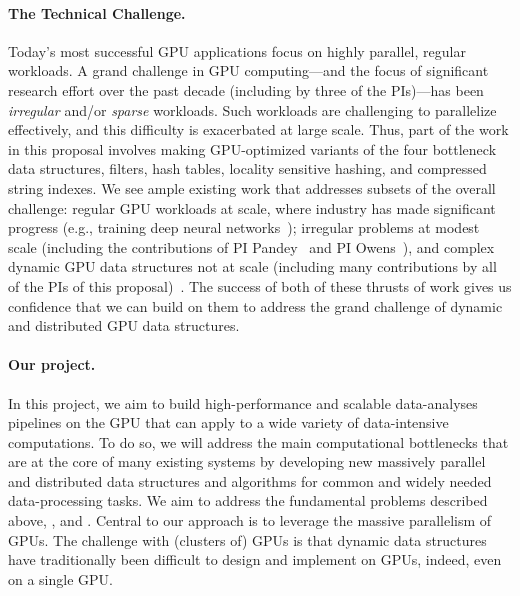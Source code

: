 \paragraph{The Technical Challenge.} Today's most successful GPU applications focus on
highly parallel, regular workloads. 
A grand challenge in GPU computing---and the focus of significant research effort over the past decade (including by three of the PIs)---has been
\emph{irregular} and/or \emph{sparse} workloads. 
Such workloads are challenging to parallelize
effectively, and this difficulty is exacerbated at large scale.
Thus, part of the work in this proposal involves making GPU-optimized variants of  the four bottleneck data structures, filters, hash tables, locality sensitive hashing, and compressed string indexes.
We see ample existing work
that addresses subsets of the overall challenge: regular GPU workloads at
scale, where industry has made significant progress (e.g., training deep neural networks~\cite{Dubey:2024:TL3}); irregular problems at modest scale (including the contributions of PI Pandey~\cite{DBLP:conf/ipps/NisaPEOBY21,DBLP:conf/ppopp/McCoyHY023} and PI Owens~\cite{Pan:2017:MGA,Chen:2022:SIP}), and complex dynamic GPU data
structures not at scale (including many contributions by all of the PIs of this
proposal)~\cite{Ashkiani:2018:ADH,Awad:2019:EAH,Junger:2020:WAL,Li:2021:DDH,mccoy2022high,Zhou:2021:DAD}.
The success of both of these thrusts of work gives us confidence
that we can build on them to address the grand challenge of dynamic and
distributed GPU data structures.






\paragraph{Our project.} In this project, we aim to build high-performance and scalable
data-analyses pipelines on the GPU that can apply to a wide variety of data-intensive
computations.  To do so, we will address the main computational
bottlenecks that are at the core of many existing systems by developing new
massively parallel and distributed data structures and algorithms for common
and widely needed data-processing tasks. We aim to address the fundamental
problems described above, , and .
%
%
Central to our approach is to leverage the massive parallelism of GPUs. The
challenge with (clusters of) GPUs  is that dynamic data structures have
traditionally  been difficult to design and implement on GPUs, indeed, even on
a single GPU\@.

